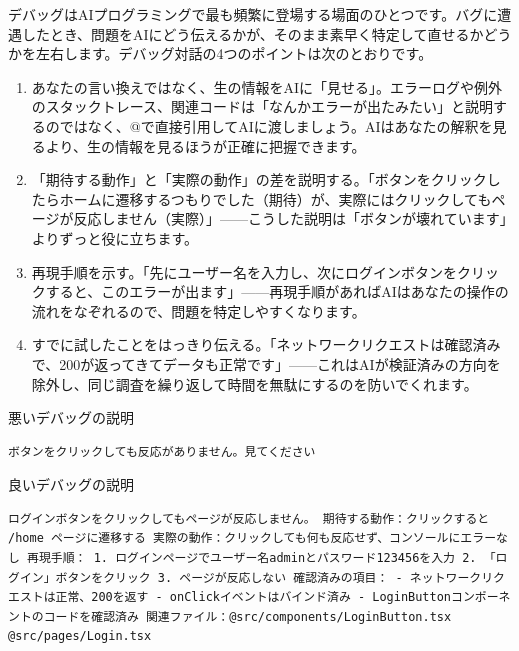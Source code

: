 
デバッグはAIプログラミングで最も頻繁に登場する場面のひとつです。バグに遭遇したとき、問題をAIにどう伝えるかが、そのまま素早く特定して直せるかどうかを左右します。デバッグ対話の4つのポイントは次のとおりです。

\begin{enumerate}
  \item あなたの言い換えではなく、生の情報をAIに「見せる」。エラーログや例外のスタックトレース、関連コードは「なんかエラーが出たみたい」と説明するのではなく、@で直接引用してAIに渡しましょう。AIはあなたの解釈を見るより、生の情報を見るほうが正確に把握できます。
  \item 「期待する動作」と「実際の動作」の差を説明する。「ボタンをクリックしたらホームに遷移するつもりでした（期待）が、実際にはクリックしてもページが反応しません（実際）」——こうした説明は「ボタンが壊れています」よりずっと役に立ちます。
  \item 再現手順を示す。「先にユーザー名を入力し、次にログインボタンをクリックすると、このエラーが出ます」——再現手順があればAIはあなたの操作の流れをなぞれるので、問題を特定しやすくなります。
  \item すでに試したことをはっきり伝える。「ネットワークリクエストは確認済みで、200が返ってきてデータも正常です」——これはAIが検証済みの方向を除外し、同じ調査を繰り返して時間を無駄にするのを防いでくれます。
\end{enumerate}

悪いデバッグの説明

\begin{lstlisting}
ボタンをクリックしても反応がありません。見てください
\end{lstlisting}

良いデバッグの説明

\begin{lstlisting}
ログインボタンをクリックしてもページが反応しません。 期待する動作：クリックすると /home ページに遷移する 実際の動作：クリックしても何も反応せず、コンソールにエラーなし 再現手順： 1. ログインページでユーザー名adminとパスワード123456を入力 2. 「ログイン」ボタンをクリック 3. ページが反応しない 確認済みの項目： - ネットワークリクエストは正常、200を返す - onClickイベントはバインド済み - LoginButtonコンポーネントのコードを確認済み 関連ファイル：@src/components/LoginButton.tsx @src/pages/Login.tsx
\end{lstlisting}


